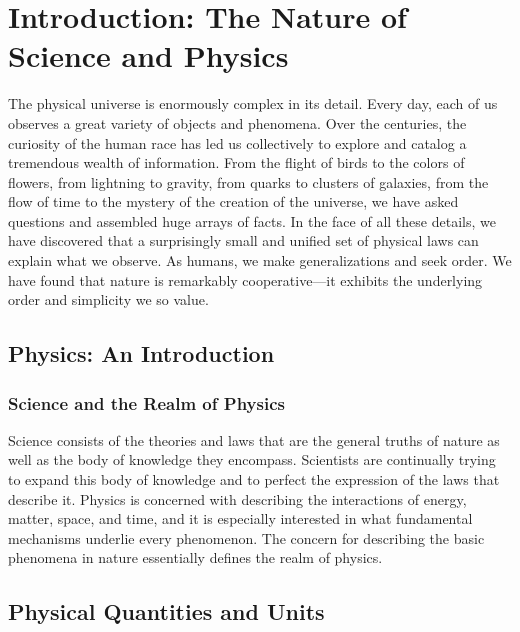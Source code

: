 \documentclass[main-ap-physics.tex]{subfiles}
\begin{document}
\section{Introduction: The Nature of Science and Physics}

The physical universe is enormously complex in its detail. Every day, each of us observes a great variety of objects and phenomena. Over the centuries, the curiosity of the human race has led us collectively to explore and catalog a tremendous wealth of information. From the flight of birds to the colors of flowers, from lightning to gravity, from quarks to clusters of galaxies, from the flow of time to the mystery of the creation of the universe, we have asked questions and assembled huge arrays of facts. In the face of all these details, we have discovered that a surprisingly small and unified set of physical laws can explain what we observe. As humans, we make generalizations and seek order. We have found that nature is remarkably cooperative---it exhibits the underlying order and simplicity we so value.

\subsection{Physics: An Introduction}

\subsubsection*{Science and the Realm of Physics}

Science consists of the theories and laws that are the general truths of nature as well as the body of knowledge they encompass. Scientists are continually trying to expand this body of knowledge and to perfect the expression of the laws that describe it. Physics is concerned with describing the interactions of energy, matter, space, and time, and it is especially interested in what fundamental mechanisms underlie every phenomenon. The concern for describing the basic phenomena in nature essentially defines the realm of physics.

\subsection{Physical Quantities and Units} \label{3vggy3}
\end{document}
